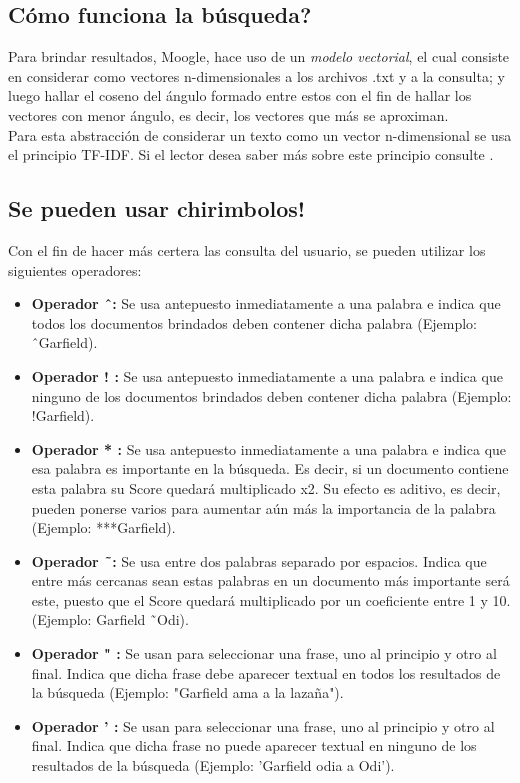 \documentclass[a4paper,12pt]{article}
\begin{document}
        \subsection{C\'omo funciona la b\'usqueda?}
            Para brindar resultados, Moogle, hace uso de un {\it modelo vectorial}, el cual 
            consiste en considerar como vectores n-dimensionales a los archivos .txt y a la consulta;
            y luego hallar el coseno del \'angulo formado entre estos con el fin de hallar los
            vectores con menor \'angulo, es decir, los vectores que m\'as  se aproximan.\\
                Para esta abstracci\'on de considerar un texto como un vector n-dimensional se usa
            el principio TF-IDF. Si el lector desea saber m\'as sobre este principio consulte \cite{TF-IDF}.
        \subsection{Se pueden usar chirimbolos!}
            Con el fin de hacer m\'as certera las consulta del usuario, se pueden utilizar los siguientes operadores:
            \begin{itemize}
                \item {\bf Operador \^\ :} Se usa antepuesto inmediatamente a una palabra e indica que todos los documentos brindados
                deben contener dicha palabra (Ejemplo: \^\ Garfield).
                \item {\bf Operador ! :} Se usa antepuesto inmediatamente a una palabra e indica que ninguno de los documentos brindados
                deben contener dicha palabra (Ejemplo: !Garfield).
                \item {\bf Operador * :} Se usa antepuesto inmediatamente a una palabra e indica que esa palabra es importante en la
                b\'usqueda. Es decir, si un documento contiene esta palabra su Score quedar\'a multiplicado x2. Su efecto es aditivo, es decir, pueden ponerse varios para aumentar a\'un m\'as la importancia
                de la palabra  (Ejemplo: ***Garfield).
                \item {\bf Operador \~\ :} Se usa entre dos palabras separado por espacios. Indica que entre m\'as cercanas sean estas palabras en
                un documento m\'as importante ser\'a este, puesto que el Score quedar\'a multiplicado por un coeficiente entre 1 y 10. (Ejemplo: Garfield \~\ Odi).
                \item {\bf Operador " :} Se usan para seleccionar una frase, uno al principio y otro al final. Indica que dicha frase debe aparecer textual 
                en todos los resultados de la b\'usqueda (Ejemplo: "Garfield ama a la laza\~na").
                \item {\bf Operador ' :} Se usan para seleccionar una frase, uno al principio y otro al final. Indica que dicha frase no puede aparecer textual 
                en ninguno de los resultados de la b\'usqueda (Ejemplo: 'Garfield odia a Odi').
            \end{itemize}
\end{document}
